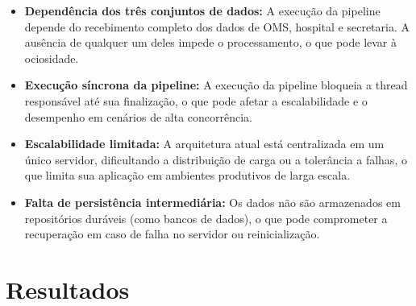 \documentclass{article}
\begin{document}
\begin{itemize}
    \item \textbf{Dependência dos três conjuntos de dados:} A execução da pipeline depende do recebimento completo dos dados de OMS, hospital e secretaria. A ausência de qualquer um deles impede o processamento, o que pode levar à ociosidade.


    \item \textbf{Execução síncrona da pipeline:} A execução da pipeline bloqueia a thread responsável até sua finalização, o que pode afetar a escalabilidade e o desempenho em cenários de alta concorrência.

    \item \textbf{Escalabilidade limitada:} A arquitetura atual está centralizada em um único servidor, dificultando a distribuição de carga ou a tolerância a falhas, o que limita sua aplicação em ambientes produtivos de larga escala.

    \item \textbf{Falta de persistência intermediária:} Os dados não são armazenados em repositórios duráveis (como bancos de dados), o que pode comprometer a recuperação em caso de falha no servidor ou reinicialização.

\end{itemize}


\section{Resultados}
\end{document}
